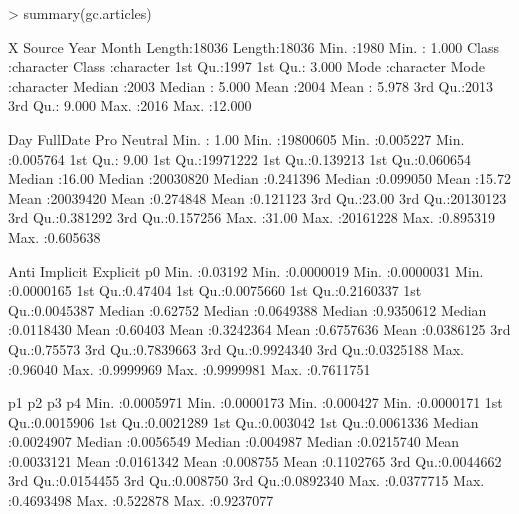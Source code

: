 \documentclass{article}
\begin{document}
\begin{Schunk}
\begin{Sinput}
> summary(gc.articles)
\end{Sinput}
\begin{Soutput}
      X                Source               Year          Month       
 Length:18036       Length:18036       Min.   :1980   Min.   : 1.000  
 Class :character   Class :character   1st Qu.:1997   1st Qu.: 3.000  
 Mode  :character   Mode  :character   Median :2003   Median : 5.000  
                                       Mean   :2004   Mean   : 5.978  
                                       3rd Qu.:2013   3rd Qu.: 9.000  
                                       Max.   :2016   Max.   :12.000  
                                                                      
      Day           FullDate             Pro              Neutral        
 Min.   : 1.00   Min.   :19800605   Min.   :0.005227   Min.   :0.005764  
 1st Qu.: 9.00   1st Qu.:19971222   1st Qu.:0.139213   1st Qu.:0.060654  
 Median :16.00   Median :20030820   Median :0.241396   Median :0.099050  
 Mean   :15.72   Mean   :20039420   Mean   :0.274848   Mean   :0.121123  
 3rd Qu.:23.00   3rd Qu.:20130123   3rd Qu.:0.381292   3rd Qu.:0.157256  
 Max.   :31.00   Max.   :20161228   Max.   :0.895319   Max.   :0.605638  
                                                                         
      Anti            Implicit            Explicit               p0           
 Min.   :0.03192   Min.   :0.0000019   Min.   :0.0000031   Min.   :0.0000165  
 1st Qu.:0.47404   1st Qu.:0.0075660   1st Qu.:0.2160337   1st Qu.:0.0045387  
 Median :0.62752   Median :0.0649388   Median :0.9350612   Median :0.0118430  
 Mean   :0.60403   Mean   :0.3242364   Mean   :0.6757636   Mean   :0.0386125  
 3rd Qu.:0.75573   3rd Qu.:0.7839663   3rd Qu.:0.9924340   3rd Qu.:0.0325188  
 Max.   :0.96040   Max.   :0.9999969   Max.   :0.9999981   Max.   :0.7611751  
                                                                              
       p1                  p2                  p3                 p4           
 Min.   :0.0005971   Min.   :0.0000173   Min.   :0.000427   Min.   :0.0000171  
 1st Qu.:0.0015906   1st Qu.:0.0021289   1st Qu.:0.003042   1st Qu.:0.0061336  
 Median :0.0024907   Median :0.0056549   Median :0.004987   Median :0.0215740  
 Mean   :0.0033121   Mean   :0.0161342   Mean   :0.008755   Mean   :0.1102765  
 3rd Qu.:0.0044662   3rd Qu.:0.0154455   3rd Qu.:0.008750   3rd Qu.:0.0892340  
 Max.   :0.0377715   Max.   :0.4693498   Max.   :0.522878   Max.   :0.9237077  
                                                                               

\end{Soutput}
\end{Schunk}
\end{document}
